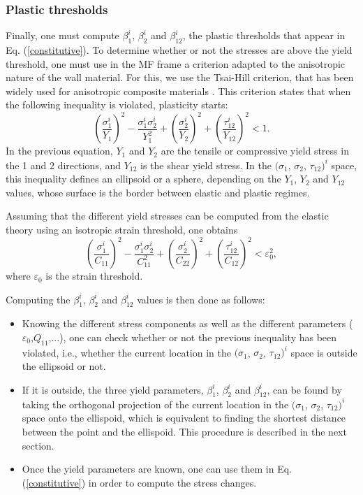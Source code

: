 \documentclass[]{article}
\begin{document}
\subsubsection{Plastic thresholds}
Finally, one must compute $\beta_1^i$, $\beta_2^i$ and $\beta_{12}^i$, the plastic thresholds that appear in Eq. (\ref{constitutive}).
To determine whether or not the stresses are above the yield threshold, one must use in the MF frame a criterion adapted to the anisotropic nature of the wall material. For this, we use the Tsai-Hill criterion, that has been widely used for anisotropic composite materials \citep{tsai65, fuc06, mor15}. This criterion states that when the following inequality is violated, plasticity starts:
\begin{equation}\label{tsai_hill}
	\left(\frac{\sigma_1^i}{Y_1}\right)^2 - \frac{\sigma_1^i \sigma_2^i}{Y_1^2} + \left(\frac{\sigma_2^i}{Y_2}\right)^2 + \left(\frac{\tau_{12}^i}{Y_{12}}\right)^2 <1.
\end{equation}
In the previous equation, $Y_1$ and $Y_2$ are the tensile or compressive yield stress in the 1 and 2 directions, and $Y_{12}$ is the shear yield stress. In the $(\sigma_1$, $\sigma_2$, $\tau_{12})^i$ space, this inequality defines an ellipsoid or a sphere, depending on the $Y_1$, $Y_2$ and $Y_{12}$ values, whose surface is the border between elastic and plastic regimes. 

Assuming that the different yield stresses can be computed from the elastic theory using an isotropic strain threshold, one obtains
\begin{equation}
	\left(\frac{\sigma_1^i}{C_{11}}\right)^2 - \frac{\sigma_1^i \sigma_2^i}{C_{11}^2} + \left(\frac{\sigma_2^i}{C_{22}}\right)^2 + \left(\frac{\tau_{12}^i}{C_{12}}\right)^2 <\varepsilon_0^2,
\end{equation}
where $\varepsilon_0$ is the strain threshold. 

Computing the $\beta_1^i$, $\beta_2^i$ and $\beta_{12}^i$ values is then done as follows:
\begin{itemize}
	\item Knowing the different stress components as well as the different parameters ($\varepsilon_0$,$Q_{11}$,...), one can check whether or not the previous inequality has been violated, i.e., whether the current location in the $(\sigma_1$, $\sigma_2$, $\tau_{12})^i$ space is outside the ellipsoid or not.
	\item If it is outside, the three yield parameters, $\beta_1^i$, $\beta_2^i$ and $\beta_{12}^i$, can be found by taking the orthogonal  projection of the current location in the $(\sigma_1$, $\sigma_2$, $\tau_{12})^i$ space onto the ellispoid, which is equivalent to finding the shortest distance between the point and the ellispoid. This procedure is described in the next section.
	\item Once the yield parameters are known, one can use them in Eq. (\ref{constitutive}) in order to compute the stress changes.
\end{itemize} 
\end{document}

